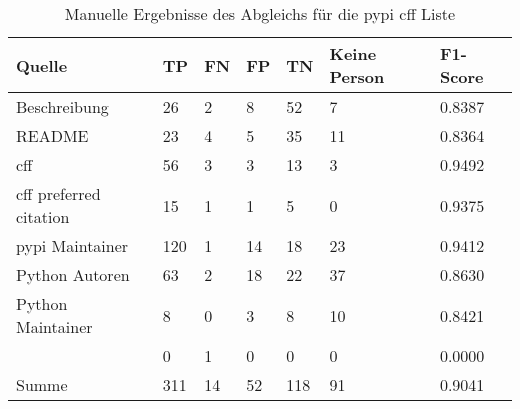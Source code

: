 \begin{table}[H]
    \centering
    \begin{tabularx}{\textwidth}{XR{.5cm}R{.5cm}R{.5cm}R{.5cm}R{2.8cm}R{2cm}}
        \toprule
        \textbf{Quelle} & \textbf{TP} & \textbf{FN} & \textbf{FP} & \textbf{TN} & \textbf{Keine Person} & \textbf{F1-Score} \\ \midrule
        Beschreibung                 & 26  & 2  & 8  & 52  & 7  & 0.8387 \\
        README                       & 23  & 4  & 5  & 35  & 11 & 0.8364 \\
        \gls{cff}                    & 56  & 3  & 3  & 13  & 3  & 0.9492 \\
        \gls{cff} preferred citation & 15  & 1  & 1  & 5   & 0  & 0.9375 \\
        \gls{pypi} Maintainer        & 120 & 1  & 14 & 18  & 23 & 0.9412 \\
        Python Autoren               & 63  & 2  & 18 & 22  & 37 & 0.8630 \\
        Python Maintainer            & 8   & 0  & 3  & 8   & 10 & 0.8421 \\
                      & 0   & 1  & 0  & 0   & 0  & 0.0000 \\ \midrule
        Summe                        & 311 & 14 & 52 & 118 & 91 & 0.9041 \\
        \bottomrule
    \end{tabularx}
    \caption{Manuelle Ergebnisse des Abgleichs für die \gls{pypi} \gls{cff} Liste}
    \label{tab:pypi_cff_matching_results_manual_anhang}
\end{table}
